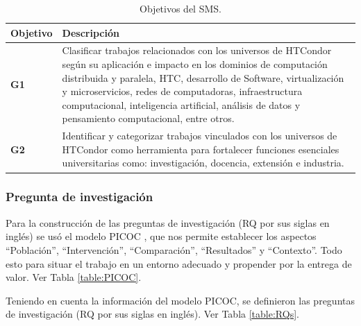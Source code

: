 \begin{table}[htbp]
	\centering
	\caption{Objetivos del SMS.}
	\label{table:Goals}
	\renewcommand{\arraystretch}{1}  %
	\begin{tabular}{p{1cm}p{6.8cm}}
		\toprule
		\textbf{Objetivo} & \textbf{Descripción}                                                                                                                                                                                                                                                                                                                                         \\
		\midrule
		\textbf{G1}       & Clasificar trabajos relacionados con los universos de HTCondor según su aplicación e impacto en los dominios de computación distribuida y paralela, HTC, desarrollo de Software, virtualización y microservicios, redes de computadoras, infraestructura computacional, inteligencia artificial, análisis de datos y pensamiento computacional, entre otros. \\
		\addlinespace[0.8em]
		\textbf{G2}       & Identificar y categorizar trabajos vinculados con los universos de HTCondor como herramienta para fortalecer funciones esenciales universitarias como: investigación, docencia, extensión e industria.                                                                                                                                                       \\
		\bottomrule
	\end{tabular}
\end{table}

\subsubsection{Pregunta de investigación}
Para la construcción de las preguntas de investigación (RQ por sus siglas en inglés) se usó el modelo PICOC \cite{Needleman20026, Petticrew2008systematic}, que nos permite establecer los aspectos ``Población'', ``Intervención'', ``Comparación'', ``Resultados'' y ``Contexto''. Todo esto para situar el trabajo en un entorno adecuado y propender por la entrega de valor. Ver Tabla \ref{table:PICOC}.

Teniendo en cuenta la información del modelo PICOC, se definieron las preguntas de investigación (RQ por sus siglas en inglés). Ver Tabla \ref{table:RQs}.

